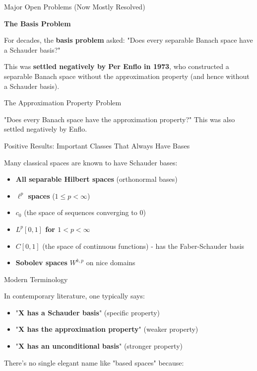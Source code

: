\documentclass[aps,preprint]{revtex4}
\newenvironment{answer}
  {\begin{tcolorbox}[colback=green!5!white,colframe=green!75!black,title=Answer]}
  {\end{tcolorbox}}
\begin{document}
\begin{answer}
Major Open Problems (Now Mostly Resolved)

\textbf{The Basis Problem}

For decades, the \textbf{basis problem} asked: "Does every separable Banach
space have a Schauder basis?"

This was \textbf{settled negatively by Per Enflo in 1973}, who constructed a
separable Banach space without the approximation property (and hence without
a Schauder basis).

The Approximation Property Problem

"Does every Banach space have the approximation property?" This was also
settled negatively by Enflo.

Positive Results: Important Classes That Always Have Bases

Many classical spaces are known to have Schauder bases:

\begin{itemize}
\item \textbf{All separable Hilbert spaces} (orthonormal bases)

\item \textbf{$\ell^p$ spaces} ($1 \leq p < \infty$)

\item \textbf{$c_0$} (the space of sequences converging to 0)

\item \textbf{$L^p[0,1]$ for $1 < p < \infty$}

\item \textbf{$C[0,1]$} (the space of continuous functions) - has the
Faber-Schauder basis

\item \textbf{Sobolev spaces} $W^{k,p}$ on nice domains
\end{itemize}

Modern Terminology

In contemporary literature, one typically says:

\begin{itemize}
\item "\textbf{X has a Schauder basis}" (specific property)

\item "\textbf{X has the approximation property}" (weaker property)

\item "\textbf{X has an unconditional basis}" (stronger property)
\end{itemize}

There's no single elegant name like "based spaces" because:


\end{answer}
\end{document}
